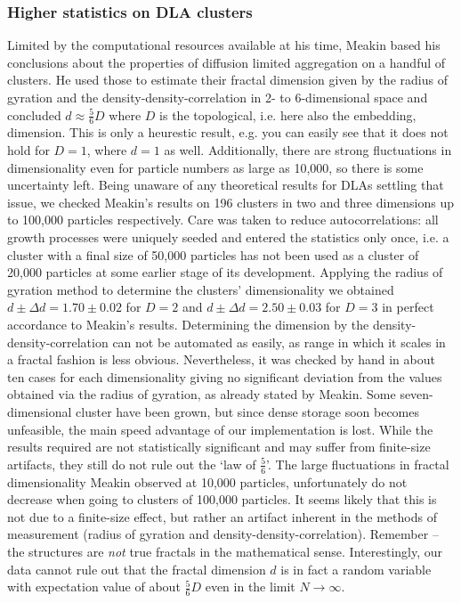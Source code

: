\documentclass[twocolumn,10pt]{scrartcl}
\begin{document}
           \subsubsection{Higher statistics on DLA clusters}
                Limited by the computational resources available at his time, Meakin based his conclusions about
                the properties of diffusion limited aggregation on a handful of clusters. He used those to estimate
                their fractal dimension given by the radius of gyration and the density-density-correlation in
                2- to 6-dimensional space and concluded $d\approx\frac{5}{6}D$ where $D$ is the topological, i.e. here
                also the embedding, dimension. This is only a heurestic result, e.g. you can easily see that it does
                not hold for $D=1$, where $d=1$ as well. Additionally, there are strong fluctuations in dimensionality
                even for particle numbers as large as 10,000, so there is some uncertainty left. Being unaware of any
                theoretical results for DLAs settling that issue, we checked Meakin's results on 196 clusters in
                two and three dimensions up to 100,000 particles respectively. Care was taken to reduce
                autocorrelations: all growth
                processes were uniquely seeded and entered the statistics only once, i.e. a cluster with a final
                size of 50,000 particles has not been used as a cluster of 20,000 particles at some earlier stage
                of its development. Applying the radius of gyration method to determine the clusters' dimensionality
                we obtained $d\pm\Delta d=1.70\pm0.02$ for $D=2$ and $d\pm\Delta d=2.50\pm0.03$  for $D=3$ in perfect
                accordance to Meakin's results. Determining the dimension by the density-density-correlation can
                not be automated as easily, as range in which it scales in a fractal fashion is less obvious.
                Nevertheless, it was checked by hand in about ten cases for each dimensionality giving no significant
                deviation from the values obtained via the radius of gyration, as already stated by Meakin.
                Some seven-dimensional cluster have been grown, but since dense storage soon becomes unfeasible,
                the main speed advantage of our implementation is lost. While the results required are not statistically
                significant and may suffer from finite-size artifacts, they still do not rule out the `law of $\frac{5}{6}$'.
                The large fluctuations in fractal dimensionality Meakin observed at 10,000 particles, unfortunately
                do not decrease when going to clusters of 100,000 particles. It seems likely that this is not due to
                a finite-size effect, but rather an artifact inherent in the methods of measurement (radius of gyration
                and density-density-correlation). Remember -- the structures are \emph{not} true fractals in the
                mathematical sense. Interestingly, our data cannot rule out that the fractal dimension $d$ is in fact
                a random variable with expectation value of about $\frac{5}{6}D$ even in the limit
                $N\rightarrow\infty$.
\end{document}
